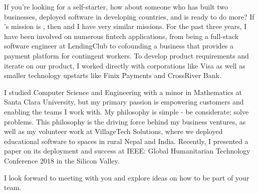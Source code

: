 \documentclass[10pt,a4paper,sans]{moderncv}        %
\begin{document}
If you're looking for a self-starter, how about someone who has built two businesses, deployed software in developing countries, and is ready to do more? If \company's mission is \mission, then \company{} and I have very similar missions. For the past three years, I have been involved on numerous fintech applications, from being a full-stack software engineer at LendingClub to cofounding a business that provides a payment platform for contingent workers. To develop product requirements and iterate on our product, I worked directly with corporations like Visa as well as smaller technology upstarts like Finix Payments and CrossRiver Bank.

I studied Computer Science and Engineering with a minor in Mathematics at Santa Clara University, but my primary passion is empowering customers and enabling the teams I work with. My philosophy is simple - be considerate; solve problems. This philosophy is the driving force behind my business ventures, as well as my volunteer work at VillageTech Solutions, where we deployed educational software to spaces in rural Nepal and India. Recently, I presented a paper on its deployment and success at IEEE: Global Humanitarian Technology Conference 2018 in the Silicon Valley.

I look forward to meeting with you and explore ideas on how to be part of your team.

\makeletterclosing

\end{document}
